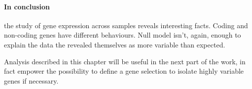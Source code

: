 \paragraph{In conclusion} the study of gene expression across samples reveals interesting facts. Coding and non-coding genes have different behaviours. Null model isn't, again, enough to explain the data the revealed themselves as more variable than expected.

Analysis described in this chapter will be useful in the next part of the work, in fact empower the possibility to define a gene selection to isolate highly variable genes if necessary.